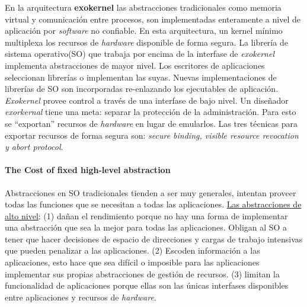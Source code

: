 
En la arquitectura \textbf{exokernel} las abstracciones tradicionales como memoria virtual y comunicación entre procesos, son implementadas enteramente a nivel de aplicación por \textit{software} no confiable. En esta arquitectura, un kernel mínimo multiplexa los recursos de \textit{hardware} disponible de forma segura. La librería de sistema operativo(SO) que trabaja por encima de la interfase de \textit{exokernel} implementa abstracciones de mayor nivel. Los escritores de aplicaciones seleccionan librerías o implementan las suyas. Nuevas implementaciones de librerías de SO son incorporadas re-enlazando los ejecutables de aplicación. \textit{Exokernel} provee control a través de una interfase de bajo nivel. Un diseñador \textit{exorkernal} tiene una meta: separar la protección de la administración. Para esto se ``exportan'' recursos de \textit{hardware} en lugar de emularlos. Las tres técnicas para exportar recursos de forma segura son: \textit{secure binding, visible resource revocation \textnormal{y} 
abort protocol}.

\paragraph{\textnormal{\textbf{The Cost of fixed high-level abstraction}}}
Abstracciones en SO tradicionales tienden a ser muy generales, intentan proveer todas las funciones que se necesitan a todas las aplicaciones. \underline{Las abstracciones de alto nivel}: (1) dañan el rendimiento porque no hay una forma de implementar una abstracción que sea la mejor para todas las aplicaciones. Obligan al SO a tener que hacer decisiones de espacio de direcciones y cargas de trabajo intensivas que pueden penalizar a las aplicaciones. (2) Escoden información a las aplicaciones, esto hace que sea difícil o imposible para las aplicaciones implementar sus propias abstracciones de gestión de recursos. (3) limitan la funcionalidad de aplicaciones porque ellas son las únicas interfases disponibles entre aplicaciones y recursos de \textit{hardware}.

